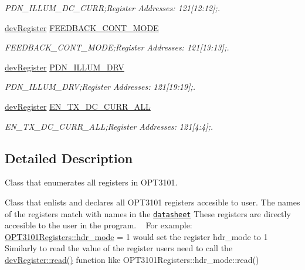 \begin{DoxyCompactItemize}
\begin{DoxyCompactList}\small\item\em P\+D\+N\+\_\+\+I\+L\+L\+U\+M\+\_\+\+D\+C\+\_\+\+C\+U\+RR;Register Addresses\+: 121\mbox{[}12\+:12\mbox{]};. \end{DoxyCompactList}\item 
\mbox{\hyperlink{classdev_register}{dev\+Register}} \mbox{\hyperlink{class_o_p_t3101_registers_af63157021f791a3763b72483dec03d72}{F\+E\+E\+D\+B\+A\+C\+K\+\_\+\+C\+O\+N\+T\+\_\+\+M\+O\+DE}}
\begin{DoxyCompactList}\small\item\em F\+E\+E\+D\+B\+A\+C\+K\+\_\+\+C\+O\+N\+T\+\_\+\+M\+O\+DE;Register Addresses\+: 121\mbox{[}13\+:13\mbox{]};. \end{DoxyCompactList}\item 
\mbox{\hyperlink{classdev_register}{dev\+Register}} \mbox{\hyperlink{class_o_p_t3101_registers_aab3ccf30f737f05458d2fa6ad7311c49}{P\+D\+N\+\_\+\+I\+L\+L\+U\+M\+\_\+\+D\+RV}}
\begin{DoxyCompactList}\small\item\em P\+D\+N\+\_\+\+I\+L\+L\+U\+M\+\_\+\+D\+RV;Register Addresses\+: 121\mbox{[}19\+:19\mbox{]};. \end{DoxyCompactList}\item 
\mbox{\hyperlink{classdev_register}{dev\+Register}} \mbox{\hyperlink{class_o_p_t3101_registers_a62b14dc38341c9be43b37b34ec69301f}{E\+N\+\_\+\+T\+X\+\_\+\+D\+C\+\_\+\+C\+U\+R\+R\+\_\+\+A\+LL}}
\begin{DoxyCompactList}\small\item\em E\+N\+\_\+\+T\+X\+\_\+\+D\+C\+\_\+\+C\+U\+R\+R\+\_\+\+A\+LL;Register Addresses\+: 121\mbox{[}4\+:4\mbox{]};. \end{DoxyCompactList}\end{DoxyCompactItemize}


\subsection{Detailed Description}
Class that enumerates all registers in O\+P\+T3101. 

Class that enlists and declares all O\+P\+T3101 registers accesible to user. The names of the registers match with names in the \href{http://www.ti.com/lit/ds/symlink/opt3101.pdf}{\tt datasheet} These registers are directly accesible to the user in the program. ~\newline
 For example\+: \mbox{\hyperlink{class_o_p_t3101_registers_ad92bd09c7b71504a6d704738f947423b}{O\+P\+T3101\+Registers\+::hdr\+\_\+mode}} = 1 would set the register hdr\+\_\+mode to 1 ~\newline
 Similarly to read the value of the register users need to call the \mbox{\hyperlink{classdev_register_ac7f2e7ec834102cdf3ebd3a6f849612a}{dev\+Register\+::read()}} function like O\+P\+T3101\+Registers\+::hdr\+\_\+mode\+::read() 


